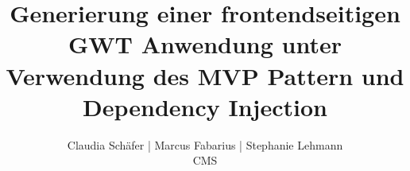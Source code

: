 \documentclass{thesis}
\begin{document}
\title{Generierung einer frontendseitigen GWT Anwendung unter Verwendung
des MVP Pattern und Dependency Injection}
\author{Claudia Schäfer	|	Marcus Fabarius	|	Stephanie Lehmann\\ CMS}












\label{Literaturverzeichnis}



\end{document}
